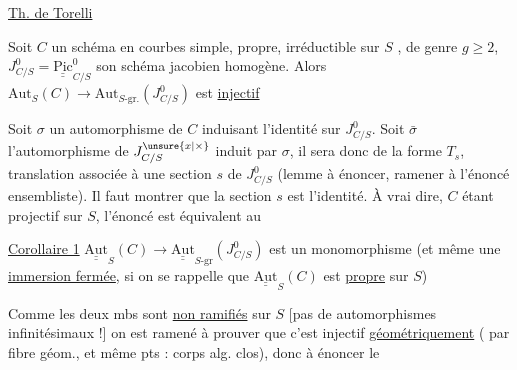 
\uline{Th. de Torelli}

\uline{} Soit $C$ un schéma en courbes simple, propre, irréductible sur $S$ , de genre $g\geq 2$, $J^0_{C/S}=\underline{\underline{\mathrm{Pic}}}^0_{C/S}$ son schéma jacobien homogène. Alors $\mathrm{Aut}_S(C)\longrightarrow\mathrm{Aut}_{S\text{-gr.}}(J^0_{C/S})$ est \uline{injectif}

Soit $\sigma$ un automorphisme de $C$ induisant l'identité sur $J^0_{C/S}$. Soit $\bar{\sigma}$ l'automorphisme de $J^{\unsure{x|\times}}_{C/S}$ induit par $\sigma$, il sera donc de la forme $T_s$, translation associée à une section $s$ de $J^0_{C/S}$ (lemme à énoncer,   ramener à l'énoncé ensembliste). Il faut montrer que la section $s$ est l'identité. À vrai dire, $C$ étant projectif sur $S$, l'énoncé est équivalent au

\uline{Corollaire 1} $\underline{\underline{\mathrm{Aut}}}_S(C)\longrightarrow\underline{\underline{\mathrm{Aut}}}_{S\text{-gr}}(J^0_{C/S})$ est un monomorphisme (et même une \uline{immersion fermée}, si on se rappelle que $\underline{\underline{\mathrm{Aut}}}_S(C)$ est \uline{propre} sur $S$)

Comme les deux mbs sont \uline{non ramifiés} sur $S$ [pas de automorphismes infinitésimaux !] on est ramené  à prouver que c'est injectif \uline{géométriquement} (  par fibre géom., et même pts :  corps alg. clos), donc à énoncer le

